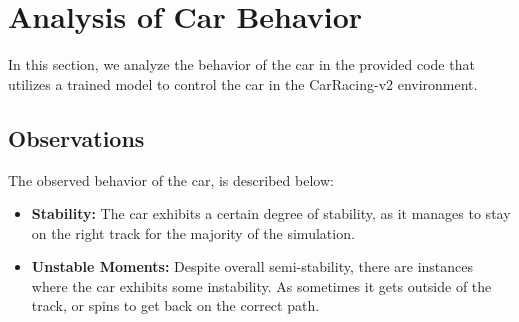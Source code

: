 \documentclass{article}
\begin{document}
\section{Analysis of Car Behavior}

In this section, we analyze the behavior of the car in the provided code that utilizes a trained model to control the car in the CarRacing-v2 environment.

\subsection{Observations}

The observed behavior of the car, is described below:

\begin{itemize}
    \item \textbf{Stability:} The car exhibits a certain degree of stability, as it manages to stay on the right track for the majority of the simulation.

    \item \textbf{Unstable Moments:} Despite overall semi-stability, there are instances where the car exhibits some instability. As sometimes it gets outside of the track, or spins to get back on the correct path.

\end{itemize}
\end{document}
